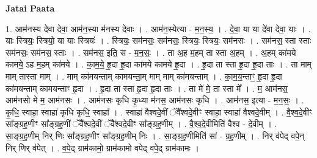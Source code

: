 \documentclass[17pt]{extarticle}
\begin{document}
\textbf{Jatai Paata} \newline

1. आम॑नस्य देवा देवा॒ आम॑न॒स्या म॑नस्य देवाः । . आम॑न॒स्येत्या - म॒न॒स्य॒ । . दे॒वा॒ या या दे॑वा देवा॒ याः । . याः स्त्रियः॒ स्त्रियो॒ या याः स्त्रियः॑ । . स्त्रियः॒ सम॑नसः॒ सम॑नसः॒ स्त्रियः॒ स्त्रियः॒ सम॑नसः । . सम॑नस॒ स्ता स्ताः सम॑नसः॒ सम॑नस॒ स्ताः । . सम॑नस॒ इति॒ स - म॒न॒सः॒ । . ता अ॒ह म॒हम् ता स्ता अ॒हम् । . अ॒हम् का॑मये कामये॒ ऽह म॒हम् का॑मये । . का॒म॒ये॒ हृ॒दा हृ॒दा का॑मये कामये हृ॒दा । . हृ॒दा ता स्ता हृ॒दा हृ॒दा ताः । . ता माम् माम् तास्ता माम् । . माम् का॑मयन्ताम् कामयन्ता॒म् माम् माम् का॑मयन्ताम् । . का॒म॒य॒न्ताꣳ॒॒ हृ॒दा हृ॒दा का॑मयन्ताम् कामयन्ताꣳ हृ॒दा । . हृ॒दा ता स्ता हृ॒दा हृ॒दा ताः । . ता मे॑ मे॒ ता स्ता मे᳚ । . म॒ आम॑नस॒ आम॑नसो मे म॒ आम॑नसः । . आम॑नसः कृधि कृ॒ध्या म॑नस॒ आम॑नसः कृधि । . आम॑नस॒ इत्या - म॒न॒सः॒ । . कृ॒धि॒ स्वाहा॒ स्वाहा॑ कृधि कृधि॒ स्वाहा᳚ । . स्वाहा॑ वैश्वदे॒वीं ॅवै᳚श्वदे॒वीꣳ स्वाहा॒ स्वाहा॑ वैश्वदे॒वीम् । . वै॒श्व॒दे॒वीꣳ सा᳚ङ्ग्रह॒णीꣳ सा᳚ङ्ग्रह॒णीं ॅवै᳚श्वदे॒वीं ॅवै᳚श्वदे॒वीꣳ सा᳚ङ्ग्रह॒णीम् । . वै॒श्व॒दे॒वीमिति॑ वैश्व - दे॒वीम् । . सा॒ङ्ग्र॒ह॒णीम् निर् णिः सा᳚ङ्ग्रह॒णीꣳ सा᳚ङ्ग्रह॒णीम् निः । . सा॒ङ्ग्र॒ह॒णीमिति॑ सां - ग्र॒ह॒णीम् । . निर् व॑पेद् वपे॒न् निर् णिर् व॑पेत् । . व॒पे॒द् ग्राम॑कामो॒ ग्राम॑कामो वपेद् वपे॒द् ग्राम॑कामः । \newline
\end{document}
